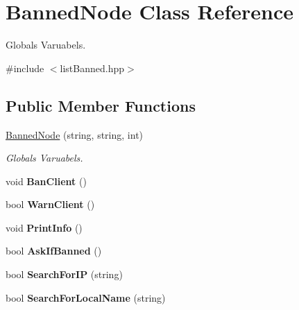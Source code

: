 \hypertarget{classBannedNode}{
\section{BannedNode Class Reference}
\label{classBannedNode}
}


Globals Varuabels.  




{\ttfamily \#include $<$listBanned.hpp$>$}

\subsection*{Public Member Functions}
\begin{DoxyCompactItemize}
\item 
\hyperlink{classBannedNode_a7554d4749594dc5b3dc26dbc32c7aba4}{BannedNode} (string, string, int)
\begin{DoxyCompactList}\small\item\em Globals Varuabels. \item\end{DoxyCompactList}\item 
\hypertarget{classBannedNode_aa3dc8eea8c8625b20b62733ecfb68f68}{
void {\bfseries BanClient} ()}
\label{classBannedNode_aa3dc8eea8c8625b20b62733ecfb68f68}

\item 
\hypertarget{classBannedNode_a2e6dec4e5c9db9851c5d2312286aed69}{
bool {\bfseries WarnClient} ()}
\label{classBannedNode_a2e6dec4e5c9db9851c5d2312286aed69}

\item 
\hypertarget{classBannedNode_aac313931687955c007f1faf02b216785}{
void {\bfseries PrintInfo} ()}
\label{classBannedNode_aac313931687955c007f1faf02b216785}

\item 
\hypertarget{classBannedNode_ade8db073ab7b988f8b7711eaf1fbad95}{
bool {\bfseries AskIfBanned} ()}
\label{classBannedNode_ade8db073ab7b988f8b7711eaf1fbad95}

\item 
\hypertarget{classBannedNode_a440b495b3ff32bf86ed06ba6418a5d57}{
bool {\bfseries SearchForIP} (string)}
\label{classBannedNode_a440b495b3ff32bf86ed06ba6418a5d57}

\item 
\hypertarget{classBannedNode_a1187b88659cb72b4bb5f5902bb58d828}{
bool {\bfseries SearchForLocalName} (string)}
\label{classBannedNode_a1187b88659cb72b4bb5f5902bb58d828}


\end{DoxyCompactItemize}

